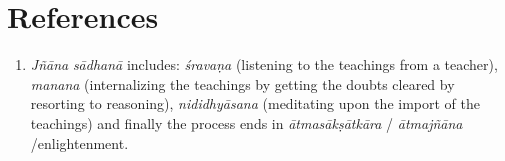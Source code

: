 \section*{References}

\begin{enumerate}
\itemsep=0pt
\item
  \emph{Jñāna} \emph{sādhanā} includes: \emph{śravaṇa} (listening to the teachings from a teacher), \emph{manana} (internalizing the teachings by getting the doubts cleared by resorting to reasoning), \emph{nididhyāsana} (meditating upon the import of the teachings) and finally the process ends in \emph{ātmasākṣātkāra} / \emph{ātmajñāna} /enlightenment.
\end{enumerate}
